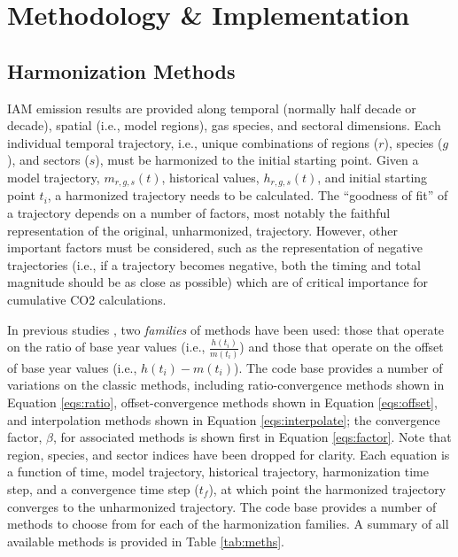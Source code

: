 \section{Methodology \& Implementation}\label{sec:meths}

\subsection{Harmonization Methods}

IAM emission results are provided along temporal (normally half decade or
decade), spatial (i.e., model regions), gas species, and sectoral
dimensions. Each individual temporal trajectory, i.e., unique combinations of
regions ($r$), species ($g$), and sectors ($s$), must be harmonized to the
initial starting point. Given a model trajectory, $m_{r, g, s}(t)$, historical
values, $h_{r, g, s}(t)$, and initial starting point $t_i$, a harmonized
trajectory needs to be calculated. The ``goodness of fit'' of a trajectory depends on
a number of factors, most notably the faithful representation of the original,
unharmonized, trajectory. However, other important factors must be considered,
such as the representation of negative trajectories (i.e., if a trajectory
becomes negative, both the timing and total magnitude should be as close as
possible) which are of critical importance for cumulative CO2 calculations.
% 
% 

In previous studies \cite{meinshausen_rcp_2011,rogelj_discrepancies_2011}, two
\textit{families} of methods have been used: those that operate on the ratio of
base year values (i.e., $\frac{h(t_i)}{m(t_i)}$) and those that operate on the
offset of base year values (i.e., $h(t_i) - m(t_i)$). The  code
base provides a number of variations on the classic methods, including
ratio-convergence methods shown in Equation \ref{eqs:ratio}, offset-convergence
methods shown in Equation \ref{eqs:offset}, and interpolation methods shown in
Equation \ref{eqs:interpolate}; the convergence factor, $\beta$, for associated
methods is shown first in Equation \ref{eqs:factor}. Note that region, species,
and sector indices have been dropped for clarity. Each equation is a function of
time, model trajectory, historical trajectory, harmonization time step, and a
convergence time step ($t_f$), at which point the harmonized trajectory
converges to the unharmonized trajectory. The  code base provides a
number of methods to choose from for each of the harmonization families. A
summary of all available methods is provided in Table \ref{tab:meths}.


